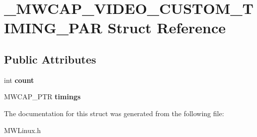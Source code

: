 \hypertarget{struct__MWCAP__VIDEO__CUSTOM__TIMING__PAR}{\section{\-\_\-\-M\-W\-C\-A\-P\-\_\-\-V\-I\-D\-E\-O\-\_\-\-C\-U\-S\-T\-O\-M\-\_\-\-T\-I\-M\-I\-N\-G\-\_\-\-P\-A\-R Struct Reference}
\label{struct__MWCAP__VIDEO__CUSTOM__TIMING__PAR}
}
\subsection*{Public Attributes}
\begin{DoxyCompactItemize}
\item 
\hypertarget{struct__MWCAP__VIDEO__CUSTOM__TIMING__PAR_a8c6f7c3a3bca8985bae91931a5848de0}{int {\bfseries count}}\label{struct__MWCAP__VIDEO__CUSTOM__TIMING__PAR_a8c6f7c3a3bca8985bae91931a5848de0}

\item 
\hypertarget{struct__MWCAP__VIDEO__CUSTOM__TIMING__PAR_af1ec94c25b4f14d63aa7aaa2d67ee3c3}{M\-W\-C\-A\-P\-\_\-\-P\-T\-R {\bfseries timings}}\label{struct__MWCAP__VIDEO__CUSTOM__TIMING__PAR_af1ec94c25b4f14d63aa7aaa2d67ee3c3}

\end{DoxyCompactItemize}


The documentation for this struct was generated from the following file\-:\begin{DoxyCompactItemize}
\item 
M\-W\-Linux.\-h\end{DoxyCompactItemize}

